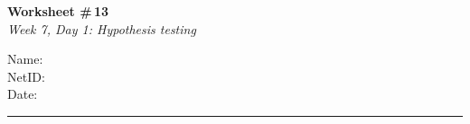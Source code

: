 \documentclass[11pt]{article}
\begin{document}
\noindent
\begin{minipage}[t]{0.55\textwidth}
  \vspace{0pt}
  {\LARGE \textbf{Worksheet \#\,13}} \\[0.3em]
  {\large \textit{Week 7, Day 1: Hypothesis testing}}
\end{minipage}
\hfill
\begin{minipage}[t]{0.40\textwidth}
  \vspace{0pt}
  \begin{mdframed}[linecolor=black, linewidth=1pt, innertopmargin=10pt, innerbottommargin=10pt]
    \small
    \vspace{0.4cm}
    Name: \underline{\hspace{4.5cm}} \\[1em]
    NetID: \underline{\hspace{4.3cm}} \\[1em]
    Date: \underline{\hspace{4.4cm}} \\
  \end{mdframed}
\end{minipage}

\vspace{1em}
\noindent\rule{\linewidth}{1pt}
\vspace{0.2em}
\end{document}
